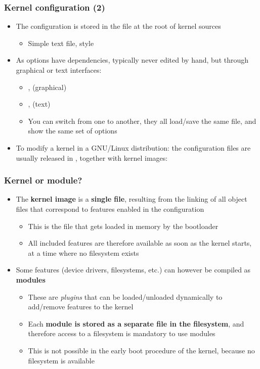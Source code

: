 \begin{frame}
  \frametitle{Kernel configuration (2)}
  \begin{itemize}
  \item The configuration is stored in the  file at the
    root of kernel sources
    \begin{itemize}
    \item Simple text file,  style
    \end{itemize}
  \item As options have dependencies, typically never edited by hand,
    but through graphical or text interfaces:
    \begin{itemize}
    \item {},  (graphical)
    \item {},  (text)
    \item You can switch from one to another, they all load/save the
      same  file, and show the same set of options
    \end{itemize}
  \item To modify a kernel in a GNU/Linux distribution: the
    configuration files are usually released in ,
    together with kernel images: 
  \end{itemize}
\end{frame}

\begin{frame}
  \frametitle{Kernel or module?}
  \begin{itemize}
  \item The {\bf kernel image} is a {\bf single file}, resulting from
    the linking of all object files that correspond to features
    enabled in the configuration
    \begin{itemize}
    \item This is the file that gets loaded in memory by the
      bootloader
    \item All included features are therefore available as soon as the
      kernel starts, at a time where no filesystem exists
    \end{itemize}
  \item Some features (device drivers, filesystems, etc.) can however
    be compiled as {\bf modules}
    \begin{itemize}
    \item These are {\em plugins} that can be loaded/unloaded dynamically to
      add/remove features to the kernel
    \item Each {\bf module is stored as a separate file in the
        filesystem}, and therefore access to a filesystem is mandatory
      to use modules
    \item This is not possible in the early boot procedure of the
      kernel, because no filesystem is available
    \end{itemize}
  \end{itemize}
\end{frame}

